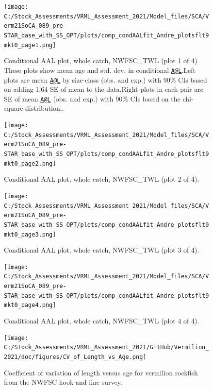 \documentclass[11pt,
  english,
  a4paper,
]{article}
\begin{document}
\begin{figure}
\centering
\texttt{[image: C:/Stock\_Assessments/VRML\_Assessment\_2021/Model\_files/SCA/Verm21SoCA\_089\_pre-STAR\_base\_with\_SS\_OPT/plots/comp\_condAALfit\_Andre\_plotsflt9mkt0\_page1.png]}
\caption{Conditional AAL plot, whole catch, NWFSC\_TWL (plot 1 of 4) These plots show mean age and std. dev. in conditional {\href{mailto:A@L}{\nolinkurl{A@L}}\leavevmode\tagmcend\tagstructend}.Left plots are mean {\href{mailto:A@L}{\nolinkurl{A@L}}\leavevmode\tagmcend\tagstructend} by size-class (obs. and exp.) with 90\% CIs based on adding 1.64 SE of mean to the data.Right plots in each pair are SE of mean {\href{mailto:A@L}{\nolinkurl{A@L}}\leavevmode\tagmcend\tagstructend} (obs. and exp.) with 90\% CIs based on the chi-square distribution..\label{fig:comp_condAALfit_Andre_plotsflt9mkt0_page1}}
\end{figure}

\begin{figure}
\centering
\texttt{[image: C:/Stock\_Assessments/VRML\_Assessment\_2021/Model\_files/SCA/Verm21SoCA\_089\_pre-STAR\_base\_with\_SS\_OPT/plots/comp\_condAALfit\_Andre\_plotsflt9mkt0\_page2.png]}
\caption{Conditional AAL plot, whole catch, NWFSC\_TWL (plot 2 of 4).\label{fig:comp_condAALfit_Andre_plotsflt9mkt0_page2}}
\end{figure}

\begin{figure}
\centering
\texttt{[image: C:/Stock\_Assessments/VRML\_Assessment\_2021/Model\_files/SCA/Verm21SoCA\_089\_pre-STAR\_base\_with\_SS\_OPT/plots/comp\_condAALfit\_Andre\_plotsflt9mkt0\_page3.png]}
\caption{Conditional AAL plot, whole catch, NWFSC\_TWL (plot 3 of 4).\label{fig:comp_condAALfit_Andre_plotsflt9mkt0_page3}}
\end{figure}

\begin{figure}
\centering
\texttt{[image: C:/Stock\_Assessments/VRML\_Assessment\_2021/Model\_files/SCA/Verm21SoCA\_089\_pre-STAR\_base\_with\_SS\_OPT/plots/comp\_condAALfit\_Andre\_plotsflt9mkt0\_page4.png]}
\caption{Conditional AAL plot, whole catch, NWFSC\_TWL (plot 4 of 4).\label{fig:comp_condAALfit_Andre_plotsflt9mkt0_page4}}
\end{figure}

\FloatBarrier

\FloatBarrier

\begin{figure}
\centering
\texttt{[image: C:/Stock\_Assessments/VRML\_Assessment\_2021/GitHub/Vermilion\_2021/doc/figures/CV\_of\_Length\_vs\_Age.png]}
\caption{Coefficient of variation of length versus age for vermilion rockfish from the NWFSC hook-and-line survey.\label{fig:cv-length-age}}
\end{figure}
\end{document}
